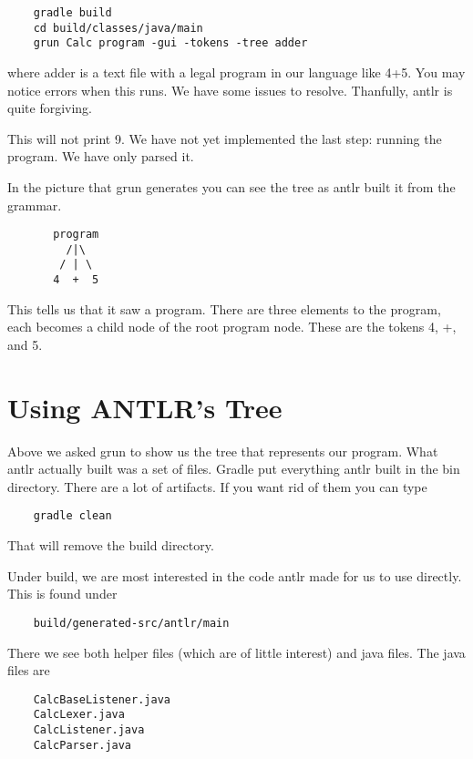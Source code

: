 {\footnotesize
\begin{verbatim}
    gradle build
    cd build/classes/java/main
    grun Calc program -gui -tokens -tree adder
\end{verbatim}
}

where adder is a text file with a legal program in our language like 4+5.
You may notice errors when this runs. We have some issues to resolve.
Thanfully, antlr is quite forgiving.

This will not print 9. We have not yet implemented the last step: running
the program. We have only parsed it.

In the picture that grun generates you can see the tree as antlr built
it from the grammar.

{\footnotesize
\begin{verbatim}
       program
         /|\
        / | \
       4  +  5
\end{verbatim}
}

This tells us that it saw a program. There are three elements to the
program, each becomes a child node of the root program node. These
are the tokens 4, +, and 5.

\section{Using ANTLR's Tree}

Above we asked grun to show us the tree that represents our program.
What antlr actually built was a set of files. Gradle put everything
antlr built in the bin directory. There are a lot of artifacts. If you
want rid of them you can type

{\footnotesize
\begin{verbatim}
    gradle clean
\end{verbatim}
}

That will remove the build directory.

Under build, we are most interested in the code antlr made for us to
use directly. This is found under

{\footnotesize
\begin{verbatim}
    build/generated-src/antlr/main
\end{verbatim}
}

There we see both helper files (which are of little interest) and
java files. The java files are

{\footnotesize
\begin{verbatim}
    CalcBaseListener.java
    CalcLexer.java
    CalcListener.java
    CalcParser.java
\end{verbatim}
}

